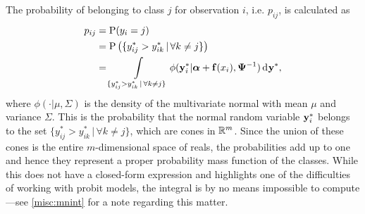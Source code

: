 \newcommand{\intset}{\{y_{ij}^* > y_{ik}^* \,|\, \forall k \neq j\}}
The probability of belonging to class $j$ for observation $i$, i.e. $p_{ij}$, is calculated as
\begin{align}
  p_{ij} 
  &= \Prob(y_i = j) \nonumber \\
  &= \Prob\big(\intset\big) \nonumber \\
  &= \int\displaylimits_{\intset} \phi(\by_i^*|\balpha + \bff(x_i), \bPsi^{-1}) \dint\by^* \label{eq:pij},
\end{align}
where $\phi(\cdot|\mu,\Sigma)$ is the density of the multivariate normal with mean $\mu$ and variance $\Sigma$.
This is the probability that the normal random variable ${\mathbf y}_i^*$ belongs to the set $\intset$, which are cones in $\mathbb{R}^m$.
Since the union of these cones is the entire $m$-dimensional space of reals, the probabilities add up to one and hence they represent a proper probability mass function of the classes.
While this does not have a closed-form expression and highlights one of the difficulties of working with probit models, the integral is by no means impossible to compute---see \cref{misc:mnint} for a note regarding this matter.


